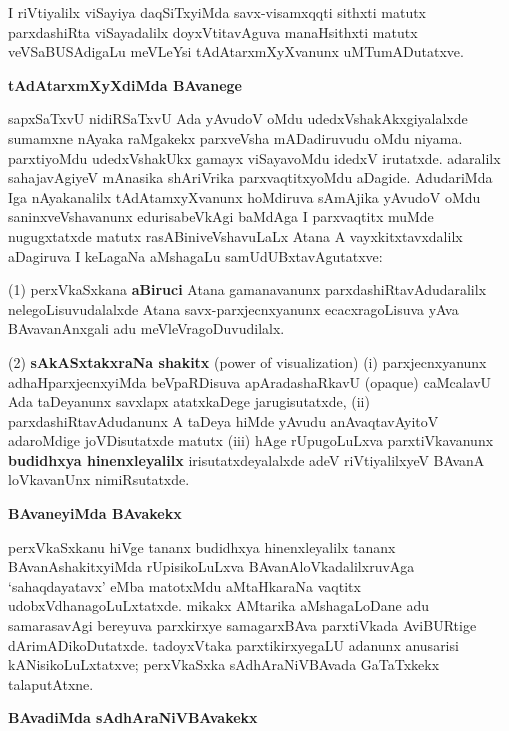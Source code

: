I riVtiyalilx viSayiya daqSiTxyiMda savx-visamxqqti sithxti matutx parxdashiRta viSayadalilx doyxVtitavAguva manaHsithxti matutx veVSaBUSAdigaLu meVLeYsi tAdAtarxmXyXvanunx uMTumADutatxve.

\bigskip
\begin{center}
{\Large\bf tAdAtarxmXyXdiMda BAvanege}
\end{center}

sapxSaTxvU nidiRSaTxvU Ada yAvudoV oMdu udedxVshakAkxgiyalalxde sumamxne nAyaka raMgakekx parxveVsha mADadiruvudu oMdu niyama. parxtiyoMdu udedxVshakUkx gamayx viSayavoMdu idedxV irutatxde. adaralilx sahajavAgiyeV mAnasika shAriVrika parxvaqtitxyoMdu aDagide. AdudariMda Iga nAyakanalilx tAdAtamxyXvanunx hoMdiruva sAmAjika yAvudoV oMdu saninxveVshavanunx edurisabeVkAgi baMdAga I parxvaqtitx muMde nugugxtatxde matutx rasABiniveVshavuLaLx Atana A vayxkitxtavxdalilx aDagiruva I keLagaNa aMshagaLu samUdUBxtavAgutatxve:

(1) perxVkaSxkana {\bf aBiruci} Atana gamanavanunx parxdashiRtavAdudaralilx nelegoLisuvu\-dalalxde Atana savx-parxjecnxyanunx ecacxragoLisuva yAva BAvavanAnxgali adu meVleVragoDuvudilalx.

(2) {\bf sAkASxtakxraNa shakitx} {\rm(power of visualization)} {\rm(i)} parxjecnxyanunx adhaHparxjecnxyiMda beVpaRDisuva apAradashaRkavU {\rm(opaque)} caMcalavU Ada taDeyanunx savxlapx atatxkaDege jarugisutatxde, {\rm(ii)} parxdashiRtavAdudanunx A taDeya hiMde yAvudu anAvaqtavAyitoV adaroMdige joVDisutatxde matutx {\rm(iii)} hAge rUpugoLuLxva parxtiVkavanunx {\bf budidhxya hinenxleyalilx} irisutatxdeyalalxde adeV riVtiyalilxyeV BAvanA loVkavanUnx nimiRsutatxde.

\bigskip
\begin{center}
{\Large\bf BAvaneyiMda BAvakekx}
\end{center}

perxVkaSxkanu hiVge tananx budidhxya hinenxleyalilx tananx BAvanAshakitxyiMda rUpisikoLuLxva BAvanAloVkadalilxruvAga `sahaqdayatavx' eMba matotxMdu aMtaHkaraNa vaqtitx udobxV\-dhanagoLuLxtatxde. mikakx AMtarika aMshagaLoDane adu samarasavAgi bereyuva parxkirxye samagarxBAva parxtiVkada AviBURtige dArimADikoDutatxde. tadoyxVtaka parxtikirxyegaLU adanunx anusarisi kANisikoLuLxtatxve; perxVkaSxka sAdhAraNiVBAvada GaTaTxkekx talaputAtxne.

\newpage

\begin{center}
{\Large\bf BAvadiMda sAdhAraNiVBAvakekx}
\end{center}

